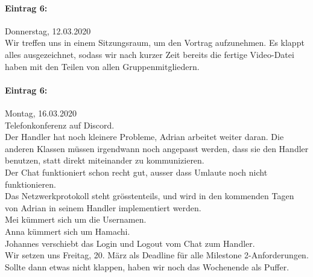 \documentclass[12pt]{article}
\begin{document}
\paragraph{Eintrag 6:}
Donnerstag, 12.03.2020\\
Wir treffen uns in einem Sitzungsraum, um den Vortrag aufzunehmen. Es klappt alles ausgezeichnet, sodass wir nach kurzer Zeit bereits die fertige Video-Datei haben mit den Teilen von allen Gruppenmitgliedern.

\paragraph{Eintrag 6:}
Montag, 16.03.2020\\
Telefonkonferenz auf Discord.\\
Der Handler hat noch kleinere Probleme, Adrian arbeitet weiter daran. Die anderen Klassen m\"ussen irgendwann noch angepasst werden, dass sie den Handler benutzen, statt direkt miteinander zu kommunizieren.\\
Der Chat funktioniert schon recht gut, ausser dass Umlaute noch  nicht funktionieren.\\
Das Netzwerkprotokoll steht gr\"osstenteils, und wird in den kommenden Tagen von Adrian in seinem Handler implementiert werden.\\
Mei k\"ummert sich um die Usernamen.\\
Anna k\"ummert sich um Hamachi.\\
Johannes verschiebt das Login und Logout vom Chat zum Handler.\\
Wir setzen uns Freitag, 20. M\"arz als Deadline für alle Milestone 2-Anforderungen. Sollte dann etwas nicht klappen, haben wir noch das Wochenende als Puffer.
\end{document}
